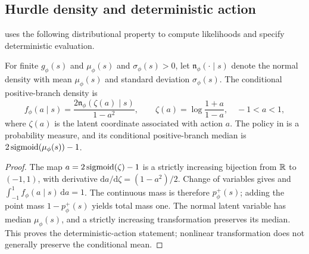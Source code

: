 \newpage
\subsection{Hurdle density and deterministic action}
\label{app:properties:hurdle}

 uses the following distributional property to
compute likelihoods and specify deterministic evaluation.

\begin{proposition}
\label{prop:hurdle}
For finite $g_{\phi}(s)$ and $\mu_{\phi}(s)$ and
$\sigma_{\phi}(s)>0$, let $\mathfrak{n}_{\phi}(\cdot\mid s)$ denote the
normal density with mean $\mu_{\phi}(s)$ and standard deviation
$\sigma_{\phi}(s)$. The conditional positive-branch density is
\begin{equation}
f_{\phi}(a\mid s)=
\frac{2\mathfrak{n}_{\phi}(\zeta(a)\mid s)}{1-a^2},
\qquad
\zeta(a)=\log\frac{1+a}{1-a},\quad -1<a<1,
\label{eq:positive_density}
\end{equation}
where $\zeta(a)$ is the latent coordinate associated with action $a$.
The policy in  is a probability measure, and its
conditional positive-branch median is $2\operatorname{sigmoid}(\mu_{\phi}(s))-1$.
\end{proposition}

\begin{proof}
The map $a=2\operatorname{sigmoid}(\zeta)-1$ is a strictly increasing bijection from
$\mathbb{R}$ to $(-1,1)$, with derivative
$\mathrm{d}a/\mathrm{d}\zeta=(1-a^2)/2$. Change of variables gives
 and
$\int_{-1}^{1}f_{\phi}(a\mid s)\,\mathrm{d}a=1$.
The continuous mass is therefore $p^+_{\phi}(s)$; adding the point mass
$1-p^+_{\phi}(s)$ yields total mass one. The normal latent variable has median
$\mu_{\phi}(s)$, and a strictly increasing transformation preserves its
median. This proves the deterministic-action statement; nonlinear
transformation does not generally preserve the conditional mean.
\end{proof}


